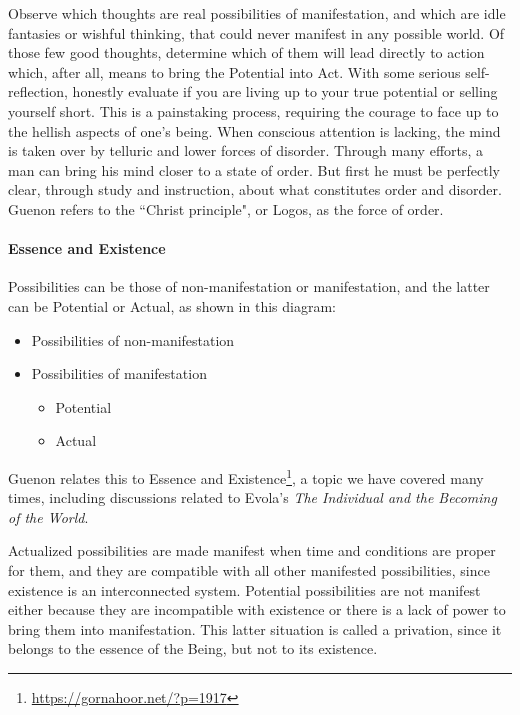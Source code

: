 Observe which thoughts are real possibilities of manifestation, and which are idle fantasies or wishful thinking, that could never manifest in any possible world. Of those few good thoughts, determine which of them will lead directly to action which, after all, means to bring the Potential into Act. With some serious self-reflection, honestly evaluate if you are living up to your true potential or selling yourself short. This is a painstaking process, requiring the courage to face up to the hellish aspects of one's being. When conscious attention is lacking, the mind is taken over by telluric and lower forces of disorder. Through many efforts, a man can bring his mind closer to a state of order. But first he must be perfectly clear, through study and instruction, about what constitutes order and disorder. Guenon refers to the ``Christ principle", or Logos, as the force of order.

\paragraph{Essence and Existence}
Possibilities can be those of non-manifestation or manifestation, and the latter can be Potential or Actual, as shown in this diagram:

\begin{itemize}
\item Possibilities of non-manifestation 
\item Possibilities of manifestation 

\begin{itemize}
\item Potential 
\item Actual 
\end{itemize}
\end{itemize}
Guenon relates this to Essence and Existence\footnote{\url{https://gornahoor.net/?p=1917}}, a topic we have covered many times, including discussions related to Evola's \textit{The Individual and the Becoming of the World}.

Actualized possibilities are made manifest when time and conditions are proper for them, and they are compatible with all other manifested possibilities, since existence is an interconnected system. Potential possibilities are not manifest either because they are incompatible with existence or there is a lack of power to bring them into manifestation. This latter situation is called a privation, since it belongs to the essence of the Being, but not to its existence.

